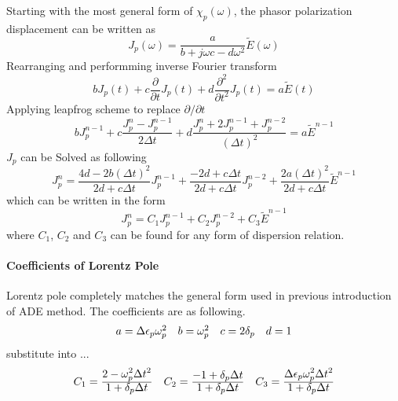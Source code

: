 Starting with the most general form of $\chi_p(\omega)$, the phasor polarization displacement can be written
as
\begin{equation}
  J_p(\omega) = \frac{a}{b + j\omega c - d\omega^2}\widetilde{E}(\omega)
\end{equation}
Rearranging and performming inverse Fourier transform 
\begin{equation}
  bJ_p(t) + c \frac{\partial}{\partial t}J_p(t) + d \frac{\partial ^2}{\partial t^2}J_p(t) = a\widetilde{E}(t)
\end{equation}
Applying leapfrog scheme to replace $\partial/\partial t$
\begin{equation}
  bJ_p^{n-1} + c \frac{J_p^n - J_p^{n-1}}{2\Delta t} + d \frac{J_p^n + 2J_p^{n-1} + J_p^{n-2}}{(\Delta t)^2} = a\widetilde{E}^{n-1}
\end{equation}
$J_p$ can be Solved as following
\begin{equation}
  J_p^n = \frac{4d-2b(\Delta t)^2}{2d+c\Delta t}J_p^{n-1} + \frac{-2d+c\Delta t}{2d+c\Delta t}J_p^{n-2} + \frac{2a(\Delta t)^2}{2d+c\Delta t}\widetilde{E}^{n-1}
\end{equation}
which can be written in the form 
\begin{equation}
  J_p^n = C_1 J_p^{n-1} + C_2 J_p^{n-2} + C_3 \widetilde{E}^{n-1}
\end{equation}
where $C_1$, $C_2$ and $C_3$ can be found for any form of dispersion relation.


\paragraph{\msjh Coefficients of Lorentz Pole}
Lorentz pole completely matches the general form used in previous introduction of ADE method. The coefficients are as
following.
\begin{equation*}
  \begin{array}{@{}llll@{}}
    a = \Delta\epsilon_p\omega_p^2 &
    b = \omega_p^2 &
    c = 2\delta_p &
    d = 1
  \end{array}
\end{equation*}
substitute into ...
\begin{gather*}
  \begin{array}{@{}lll@{}}
    C_1 = \frac{\displaystyle 2-\omega_p^2\Delta t^2}{\displaystyle 1+\delta_p\Delta t} &
    C_2 = \frac{\displaystyle -1 + \delta_p\Delta t}{\displaystyle 1+\delta_p\Delta t} &
    C_3 = \frac{\displaystyle \Delta\epsilon_p\omega_p^2\Delta t^2}{\displaystyle 1+\delta_p\Delta t}
  \end{array}
\end{gather*}


